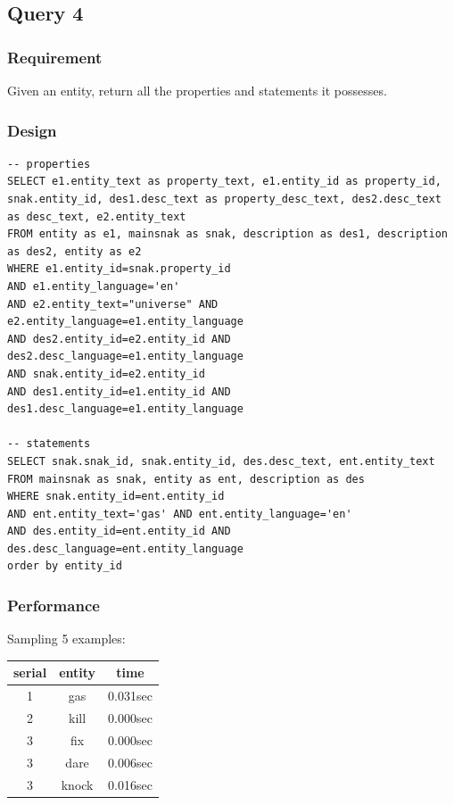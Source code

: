 \documentclass[12pt]{article}
\begin{document}
\subsection{Query 4}
\subsubsection{Requirement}
Given an entity, return all the properties and statements it possesses.
\subsubsection{Design}
\lstset{language=SQL}
\begin{lstlisting}
-- properties
SELECT e1.entity_text as property_text, e1.entity_id as property_id, snak.entity_id, des1.desc_text as property_desc_text, des2.desc_text as desc_text, e2.entity_text
FROM entity as e1, mainsnak as snak, description as des1, description as des2, entity as e2
WHERE e1.entity_id=snak.property_id
AND e1.entity_language='en'
AND e2.entity_text="universe" AND e2.entity_language=e1.entity_language
AND des2.entity_id=e2.entity_id AND des2.desc_language=e1.entity_language
AND snak.entity_id=e2.entity_id
AND des1.entity_id=e1.entity_id AND des1.desc_language=e1.entity_language

-- statements
SELECT snak.snak_id, snak.entity_id, des.desc_text, ent.entity_text
FROM mainsnak as snak, entity as ent, description as des
WHERE snak.entity_id=ent.entity_id
AND ent.entity_text='gas' AND ent.entity_language='en'
AND des.entity_id=ent.entity_id AND des.desc_language=ent.entity_language
order by entity_id
\end{lstlisting}
\subsubsection{Performance}
Sampling 5 examples:
\begin{center}
  \begin{tabular}{ | c | c | c |}
    \hline
    serial & entity & time \\ \hline\hline
    1 & gas & 0.031sec \\ \hline
    2 & kill & 0.000sec \\ \hline
    3 & fix & 0.000sec \\ \hline
    3 & dare & 0.006sec \\ \hline
    3 & knock & 0.016sec \\
    \hline
  \end{tabular}
\end{center}
\end{document}
